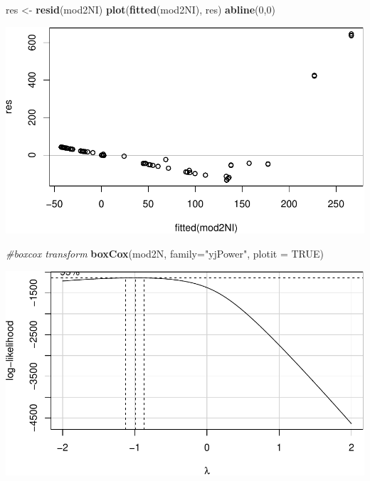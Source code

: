 \documentclass[
]{article}
\newenvironment{Shaded}{\begin{snugshade}}{\end{snugshade}}
\newcommand{\CommentTok}[1]{\textcolor[rgb]{0.56,0.35,0.01}{\textit{#1}}}
\newcommand{\DataTypeTok}[1]{\textcolor[rgb]{0.13,0.29,0.53}{#1}}
\newcommand{\DecValTok}[1]{\textcolor[rgb]{0.00,0.00,0.81}{#1}}
\newcommand{\KeywordTok}[1]{\textcolor[rgb]{0.13,0.29,0.53}{\textbf{#1}}}
\newcommand{\NormalTok}[1]{#1}
\newcommand{\OtherTok}[1]{\textcolor[rgb]{0.56,0.35,0.01}{#1}}
\newcommand{\StringTok}[1]{\textcolor[rgb]{0.31,0.60,0.02}{#1}}
\begin{document}
\begin{Shaded}
\begin{Highlighting}[]
\NormalTok{res \textless{}{-}}\StringTok{ }\KeywordTok{resid}\NormalTok{(mod2NI)}
\KeywordTok{plot}\NormalTok{(}\KeywordTok{fitted}\NormalTok{(mod2NI), res)}
\KeywordTok{abline}\NormalTok{(}\DecValTok{0}\NormalTok{,}\DecValTok{0}\NormalTok{)}
\end{Highlighting}
\end{Shaded}

\includegraphics{main_files/figure-latex/unnamed-chunk-27-3.pdf}

\begin{Shaded}
\begin{Highlighting}[]
\CommentTok{\#boxcox transform}
\KeywordTok{boxCox}\NormalTok{(mod2N, }\DataTypeTok{family=}\StringTok{"yjPower"}\NormalTok{, }\DataTypeTok{plotit =} \OtherTok{TRUE}\NormalTok{)}
\end{Highlighting}
\end{Shaded}

\includegraphics{main_files/figure-latex/unnamed-chunk-27-4.pdf}
\end{document}
